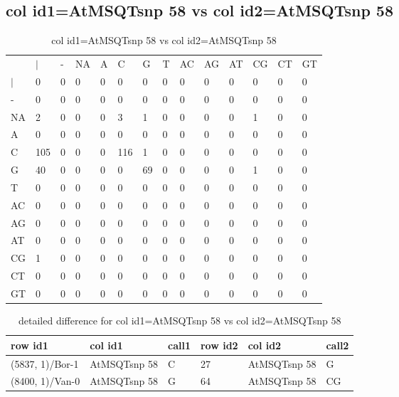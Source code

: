\subsection{col id1=AtMSQTsnp 58 vs col id2=AtMSQTsnp 58}
\begin{center}
\begin{longtable}{|l|l|l|l|l|l|l|l|l|l|l|l|l|l|}
\caption{col id1=AtMSQTsnp 58 vs col id2=AtMSQTsnp 58} \label{table_dm942}\\
\hline
\\
\hline
&$|$&-&NA&A&C&G&T&AC&AG&AT&CG&CT&GT\\
$|$&0&0&0&0&0&0&0&0&0&0&0&0&0\\
-&0&0&0&0&0&0&0&0&0&0&0&0&0\\
NA&2&0&0&0&3&1&0&0&0&0&1&0&0\\
A&0&0&0&0&0&0&0&0&0&0&0&0&0\\
C&105&0&0&0&116&1&0&0&0&0&0&0&0\\
G&40&0&0&0&0&69&0&0&0&0&1&0&0\\
T&0&0&0&0&0&0&0&0&0&0&0&0&0\\
AC&0&0&0&0&0&0&0&0&0&0&0&0&0\\
AG&0&0&0&0&0&0&0&0&0&0&0&0&0\\
AT&0&0&0&0&0&0&0&0&0&0&0&0&0\\
CG&1&0&0&0&0&0&0&0&0&0&0&0&0\\
CT&0&0&0&0&0&0&0&0&0&0&0&0&0\\
GT&0&0&0&0&0&0&0&0&0&0&0&0&0\\
\hline
\end{longtable}
\end{center}

\begin{center}
\begin{longtable}{|l|l|l|l|l|l|}
\caption{detailed difference for col id1=AtMSQTsnp 58 vs col id2=AtMSQTsnp 58} \label{table_dm943}\\
\hline
row id1&col id1&call1&row id2&col id2&call2\\
\hline
(5837, 1)/Bor-1&AtMSQTsnp 58&C&27&AtMSQTsnp 58&G\\
(8400, 1)/Van-0&AtMSQTsnp 58&G&64&AtMSQTsnp 58&CG\\
\hline
\end{longtable}
\end{center}

